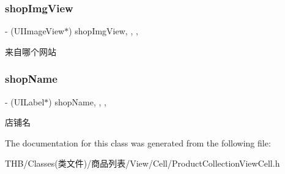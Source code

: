 \subsubsection{\texorpdfstring{shop\+Img\+View}{shopImgView}}
{\footnotesize\ttfamily -\/ (U\+I\+Image\+View$\ast$) shop\+Img\+View\hspace{0.3cm}{\ttfamily [read]}, {\ttfamily [write]}, {\ttfamily [nonatomic]}, {\ttfamily [strong]}}

来自哪个网站 \mbox{\label{interface_product_collection_view_cell_ae7f077f94da87cddfc080e935675a28b}} 
\subsubsection{\texorpdfstring{shop\+Name}{shopName}}
{\footnotesize\ttfamily -\/ (U\+I\+Label$\ast$) shop\+Name\hspace{0.3cm}{\ttfamily [read]}, {\ttfamily [write]}, {\ttfamily [nonatomic]}, {\ttfamily [strong]}}

店铺名 

The documentation for this class was generated from the following file\+:\begin{DoxyCompactItemize}
\item 
T\+H\+B/\+Classes(类文件)/商品列表/\+View/\+Cell/Product\+Collection\+View\+Cell.\+h\end{DoxyCompactItemize}
